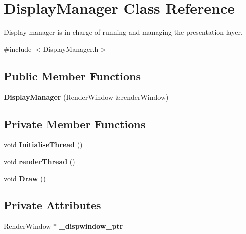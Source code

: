 \hypertarget{class_display_manager}{}\section{Display\+Manager Class Reference}
\label{class_display_manager}


Display manager is in charge of running and managing the presentation layer.  




{\ttfamily \#include $<$Display\+Manager.\+h$>$}

\subsection*{Public Member Functions}
\begin{DoxyCompactItemize}
\item 
\mbox{\label{class_display_manager_a5cae0a0f81cbd2457eca8d35733a0516}} 
{\bfseries Display\+Manager} (Render\+Window \&render\+Window)
\end{DoxyCompactItemize}
\subsection*{Private Member Functions}
\begin{DoxyCompactItemize}
\item 
\mbox{\label{class_display_manager_ab1c3eaf2694410423b6b1eca6a58436f}} 
void {\bfseries Initialise\+Thread} ()
\item 
\mbox{\label{class_display_manager_a79b7a390f3a2a09e7209d271e589e705}} 
void {\bfseries render\+Thread} ()
\item 
\mbox{\label{class_display_manager_a59cef8980a225ca13757e362a92891d1}} 
void {\bfseries Draw} ()
\end{DoxyCompactItemize}
\subsection*{Private Attributes}
\begin{DoxyCompactItemize}
\item 
\mbox{\label{class_display_manager_abe0369d0fa6b544c77d9d50d50f949cf}} 
Render\+Window $\ast$ {\bfseries \+\_\+dispwindow\+\_\+ptr}
\end{DoxyCompactItemize}


